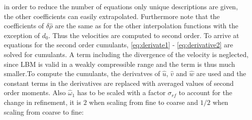 in order to reduce the number of equations only unique descriptions are given, the other coefficients can easily extrapolated. Furthermore note that the coefficients of $\delta \hat{\rho}$ are the same as for the other interpolation functions with the exception of $d_0$. 
Thus the velocities are computed to second order. To arrive at equations for the second order cumulants, \eqref{eq:derivate1} - \eqref{eq:derivative2} are solved for cumulants. A term including the divergence of the velocity is neglected, since LBM is valid in a weakly compressible range and the term is thus much smaller.To compute the cumulants, the derivatves of $\hat{u}$, $\hat{v}$ and $\hat{w}$ are used and the constant terms in the derivatives are replaced with averaged values of second order moments. Also $\hat{\omega}_1$ has to be scaled with a factor $\sigma_{rf}$ to account for the change in refinement, it is $2$ when scaling from fine to coarse and $1/2$ when scaling from coarse to fine:
